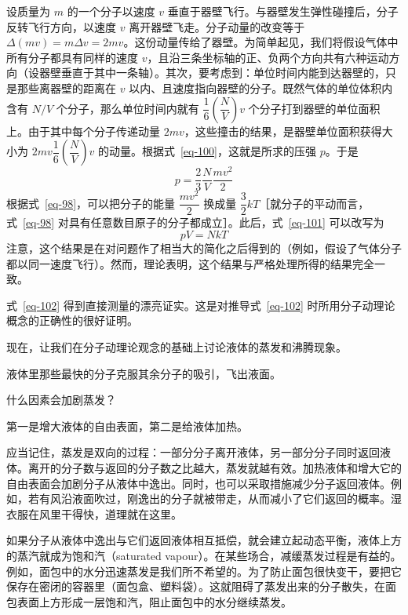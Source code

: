 \begin{dialogue}
设质量为 $m$ 的一个分子以速度 $v$ 垂直于器壁飞行。与器壁发生弹性碰撞后，分子反转飞行方向，以速度 $v$ 离开器壁飞走。分子动量的改变等于 $\Delta (mv)=m \Delta v=2mv$。这份动量传给了器壁。为简单起见，我们将假设气体中所有分子都具有同样的速度 $v$，且沿三条坐标轴的正、负两个方向共有六种运动方向（设器壁垂直于其中一条轴）。其次，要考虑到：单位时间内能到达器壁的，只是那些离器壁的距离在 $v$ 以内、且速度指向器壁的分子。既然气体的单位体积内含有 $N/V$ 个分子，那么单位时间内就有 $\dfrac{1}{6}\left(\dfrac{N}{V} \right)v$ 个分子打到器壁的单位面积上。由于其中每个分子传递动量 $2mv$，这些撞击的结果，是器壁单位面积获得大小为 $2mv \dfrac{1}{6}\left(\dfrac{N}{V} \right)v$ 的动量。根据式~\eqref{eq-100}，这就是所求的压强 $p$。于是
\begin{equation}%
p= \frac{2}{3}\frac{N}{V} \frac{mv^{2}}{2}
\label{eq-101}
\end{equation}
根据式~\eqref{eq-98}，可以把分子的能量 $\dfrac{mv^{2}}{2}$ 换成量 $\dfrac{3}{2} kT$［就分子的平动而言，式~\eqref{eq-98} 对具有任意数目原子的分子都成立］。此后，式~\eqref{eq-101} 可以改写为
\begin{equation}%
pV=NkT
\label{eq-102}
\end{equation}
注意，这个结果是在对问题作了相当大的简化之后得到的（例如，假设了气体分子都以同一速度飞行）。然而，理论表明，这个结果与严格处理所得的结果完全一致。

式~\eqref{eq-102} 得到直接测量的漂亮证实。这是对推导式~\eqref{eq-102} 时所用分子动理论概念的正确性的很好证明。

现在，让我们在分子动理论观念的基础上讨论液体的蒸发和沸腾现象。

\stda 液体里那些最快的分子克服其余分子的吸引，飞出液面。

\tchr 什么因素会加剧蒸发？

\stda 第一是增大液体的自由表面，第二是给液体加热。

\tchr 应当记住，蒸发是双向的过程：一部分分子离开液体，另一部分分子同时返回液体。离开的分子数与返回的分子数之比越大，蒸发就越有效。加热液体和增大它的自由表面会加剧分子从液体中逸出。同时，也可以采取措施减少分子返回液体。例如，若有风沿液面吹过，刚逸出的分子就被带走，从而减小了它们返回的概率。湿衣服在风里干得快，道理就在这里。

如果分子从液体中逸出与它们返回液体相互抵偿，就会建立起动态平衡，液体上方的蒸汽就成为饱和汽（saturated vapour）。在某些场合，减缓蒸发过程是有益的。例如，面包中的水分迅速蒸发是我们所不希望的。为了防止面包很快变干，要把它保存在密闭的容器里（面包盒、塑料袋）。这就阻碍了蒸发出来的分子散失，在面包表面上方形成一层饱和汽，阻止面包中的水分继续蒸发。


\end{dialogue}
